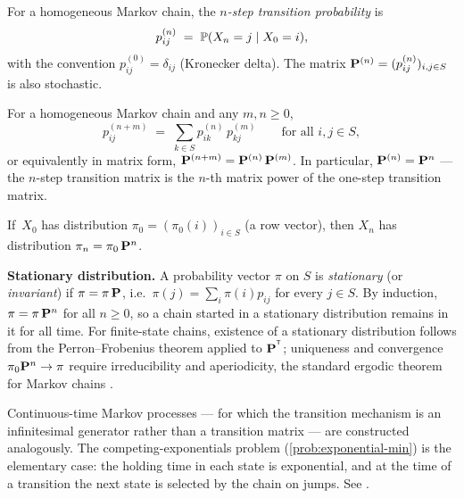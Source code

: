 \begin{definition}
\label{def:n-step-transition}
For a homogeneous Markov chain, the \emph{$n$-step transition
probability} is
\[
  p_{ij}^{(n)} \;=\; \mathbb{P}(X_n = j \mid X_0 = i),
\]
with the convention $p_{ij}^{(0)} = \delta_{ij}$ (Kronecker delta).
The matrix $\mathbf{P}^{(n)} = (p_{ij}^{(n)})_{i,j \in S}$ is also
stochastic.
\end{definition}

\begin{theorem}
\label{thm:kolmogorov-chapman}
For a homogeneous Markov chain and any $m, n \geq 0$,
\[
  p_{ij}^{(n + m)} \;=\; \sum_{k \in S} p_{ik}^{(n)}\, p_{kj}^{(m)} \qquad \text{for all } i, j \in S,
\]
or equivalently in matrix form,
$\mathbf{P}^{(n+m)} = \mathbf{P}^{(n)}\, \mathbf{P}^{(m)}$. In particular,
$\mathbf{P}^{(n)} = \mathbf{P}^n$ — the $n$-step transition matrix is the
$n$-th matrix power of the one-step transition matrix.
\end{theorem}

\begin{corollary}
\label{cor:distribution-at-n}
If~$X_0$ has distribution $\pi_0 = (\pi_0(i))_{i \in S}$ (a row
vector), then $X_n$ has distribution $\pi_n = \pi_0\, \mathbf{P}^n$.
\end{corollary}

\medskip
\noindent\textbf{Stationary distribution.} A probability vector
$\pi$ on $S$ is \emph{stationary} (or \emph{invariant}) if
$\pi = \pi\, \mathbf{P}$, i.e.\ $\pi(j) = \sum_i \pi(i) p_{ij}$ for every
$j \in S$. By induction, $\pi = \pi\, \mathbf{P}^n$ for all
$n \geq 0$, so a chain started in a stationary distribution remains
in it for all time. For finite-state chains, existence of a
stationary distribution follows from the Perron–Frobenius theorem
applied to $\mathbf{P}^{^{\mathsf{T}}}$; uniqueness and convergence
$\pi_0 \mathbf{P}^n \to \pi$ require irreducibility and aperiodicity,
the standard ergodic theorem for Markov chains
\cite[Ch.~VIII]{Shiryaev1989}.

\begin{remark}
Continuous-time Markov processes — for which the transition
mechanism is an infinitesimal generator rather than a transition
matrix — are constructed analogously. The competing-exponentials
problem (\cref{prob:exponential-min}) is the elementary case: the
holding time in each state is exponential, and at the time of a
transition the next state is selected by the chain on jumps. See
\cite[Ch.~VIII]{Sevastyanov1982}.
\end{remark}

